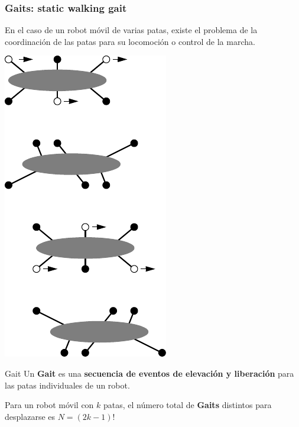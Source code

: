 \begin{frame}
    \frametitle{Gaits: static walking gait}
	\small
    En el caso de un robot móvil de varias patas, existe el problema de la coordinación de las patas para su locomoción o control de la marcha.

    \begin{center}
        \includegraphics[width=0.15\columnwidth]{images/hexapod_static_walking_gait.pdf}
    \end{center}

	
	\begin{block}{Gait}
    	Un \textbf{Gait} es una \textbf{secuencia de eventos de elevación y liberación} para las patas individuales de un robot.
	\end{block}


    
    Para un robot móvil con $k$ patas, el número total de \textbf{Gaits} distintos para desplazarse es $N = \left( 2k - 1\right)!$
    
\end{frame}

